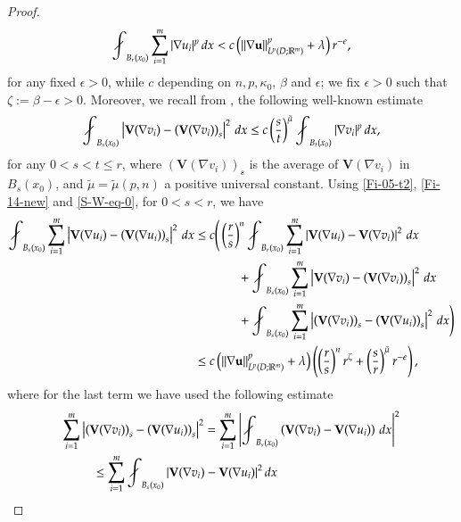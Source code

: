 \documentclass{amsart}
\def\avint{\mathop{\,\rlap{$\diagup$}\!\!\int}\nolimits}
\begin{document}
\begin{proof}
\begin{equation}
\label{Fi-14-new}
\avint_{B_{r}(x_0)} \sum_{i=1}^{m} |\nabla u_i|^p \, dx < c \left( \|\nabla \mathbf{u}\|_{L^{p}(D; \mathbb{R}^m)}^p + \lambda \right) r^{-\epsilon},
\end{equation}
for any fixed $\epsilon > 0$, while $c$ depending on $n,p, \kappa_0$, $\beta$ and $\epsilon$; we fix $\epsilon>0$ such that $\zeta:=\beta-\epsilon>0$. 
Moreover, we recall from \cite[Theorem 6.4]{diening2009everywhere}, the following well-known estimate 
\begin{equation}
\label{S-W-eq-0}
\avint_{B_s(x_0)} \left|\mathbf{V}(\nabla v_i)-\left(\mathbf{V}(\nabla v_i) \right)_s \right|^2 \, dx \leq c \left(\frac{s}{t} \right)^{\tilde{\mu}} \avint_{B_t(x_0)}  |\nabla v_i|^p \, dx,
\end{equation}
for any $0<s<t\leq r$, where $\left(\mathbf{V}(\nabla v_i) \right)_s$ is the average of $\mathbf{V}(\nabla v_i)$ in $B_s(x_0)$, and $\tilde{\mu}=\tilde{\mu}(p, n)$ a positive universal constant. Using \eqref{Fi-05-t2}, \eqref{Fi-14-new} and \eqref{S-W-eq-0}, for $0<s<r$, we have 
\begin{align} \nonumber
 \avint_{B_s(x_0)} \sum_{i=1}^{m} \left|\mathbf{V}(\nabla u_i)-\left(\mathbf{V}(\nabla u_i) \right)_s \right|^2 \, dx &\leq c \Bigg(  \left( \frac{r}{s} \right)^n \avint_{B_{r}(x_0)} \sum_{i=1}^{m} \left|\mathbf{V}(\nabla u_i)-\mathbf{V}(\nabla v_i) \right|^2 \, dx \\ \nonumber & 
\quad \qquad \,\,\, + \avint_{B_s(x_0)} \sum_{i=1}^{m} \left|\mathbf{V}(\nabla v_i)- \left(\mathbf{V}(\nabla v_i) \right)_s \right|^2 \, dx \\ \nonumber
& \quad \qquad \,\,\,  + \avint_{B_s(x_0)} \sum_{i=1}^{m} \left| \left(\mathbf{V}(\nabla v_i) \right)_s -\left(\mathbf{V}(\nabla u_i) \right)_s \right|^2 \, dx \Bigg) \\ \label{Fi-H-1}
&  \leq c \left( \|\nabla \mathbf{u}\|_{L^{p}(D; \mathbb{R}^m)}^p + \lambda \right) \left( \left( \frac{r}{s} \right)^n r^{\zeta} + \left( \frac{s}{r}\right)^{\tilde{\mu}} r^{-\epsilon} 
\right),
\end{align}
where for the last term we have used the following estimate 
$$ 
\begin{aligned}
\sum_{i=1}^{m} & \left| \left(\mathbf{V}(\nabla v_i) \right)_s -\left(\mathbf{V}(\nabla u_i) \right)_s \right|^2  
= \sum_{i=1}^{m} \left|\avint_{B_s(x_0)} \left( \mathbf{V}(\nabla v_i) - \mathbf{V}(\nabla u_i) \right) \, dx \right|^2 \\
 & \quad \le \sum_{i=1}^{m} \avint_{B_s(x_0)} \left|\mathbf{V}(\nabla v_i) - \mathbf{V}(\nabla u_i) \right|^2 dx 

\end{aligned}$$
\end{proof}
\end{document}
